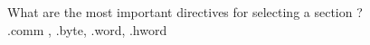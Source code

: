 \documentclass{article}
\begin{document}
\noindent What are the most important directives for selecting a section ?\\
.comm , .byte, .word, .hword
\end{document}
